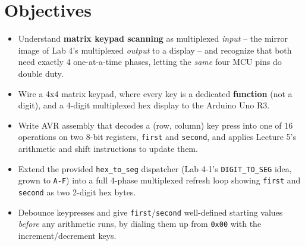\documentclass[11pt]{article}
\begin{document}
\labheader

\section*{Objectives}
\begin{itemize}[leftmargin=*,nosep]
  \item Understand \textbf{matrix keypad scanning} as multiplexed \emph{input} --
        the mirror image of Lab 4's multiplexed \emph{output} to a display -- and
        recognize that both need exactly 4 one-at-a-time phases, letting the
        \emph{same} four MCU pins do double duty.
  \item Wire a 4x4 matrix keypad, where every key is a dedicated \textbf{function}
        (not a digit), and a 4-digit multiplexed hex display to the Arduino Uno R3.
  \item Write AVR assembly that decodes a (row, column) key press into one of 16
        operations on two 8-bit registers, \texttt{first} and \texttt{second}, and
        applies Lecture 5's arithmetic and shift instructions to update them.
  \item Extend the provided \texttt{hex\_to\_seg} dispatcher (Lab 4-1's
        \texttt{DIGIT\_TO\_SEG} idea, grown to \texttt{A-F}) into a full 4-phase
        multiplexed refresh loop showing \texttt{first} and \texttt{second} as two
        2-digit hex bytes.
  \item Debounce keypresses and give \texttt{first}/\texttt{second} well-defined
        starting values \emph{before} any arithmetic runs, by dialing them up from
        \texttt{0x00} with the increment/decrement keys.
\end{itemize}
\end{document}
